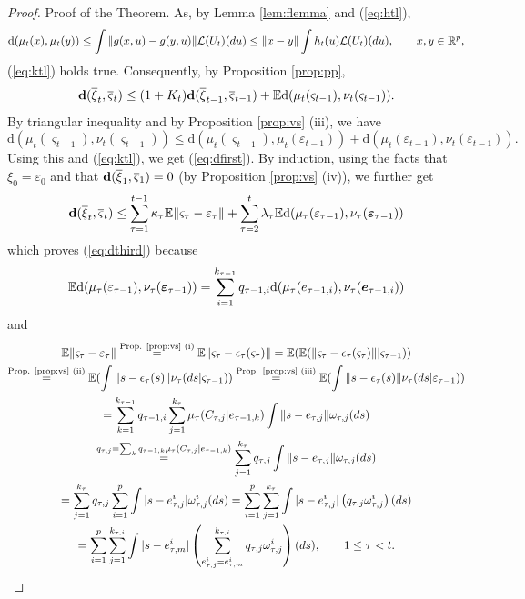 \documentclass{article}              %
\begin{document}
\begin{proof}{Proof of the Theorem.}
As, by Lemma \ref{lem:flemma} and (\ref{eq:htl}),
\[
\mathrm{d}(\mu_{t}(x),\mu_{t}(y))\leq\int\|g(x,u)-g(y,u)\|\mathcal{L}(U_{t})(du)\leq\|x-y\|\int h_{t}(u)\mathcal{L}(U_{t})(du),\qquad x,y\in\mathbb{R}^{p},
\]
(\ref{eq:ktl}) holds true. Consequently, by Proposition \ref{prop:pp},
\[
\mathbf{d}(\overline{\xi}_{t},\overline{\varsigma}_{t})\leq(1+K_{t})\mathbf{d}(\overline{\xi}_{t-1},\overline{\varsigma}_{t-1})+\mathbb{E}\mathrm{d}(\mu_{t}(\varsigma_{t-1}),\nu_{t}(\varsigma_{t-1})).
\]
By triangular inequality and by Proposition \ref{prop:vs} (iii), we have
\[
\mathrm{d}(\mu_{t}(\varsigma_{t-1}),\nu_{t}(\varsigma_{t-1}))\leq\mathrm{d}(\mu_{t}(\varsigma_{t-1}),\mu_{t}(\varepsilon_{t-1}))+\mathrm{d}(\mu_{t}(\varepsilon_{t-1}),\nu_{t}(\varepsilon{}_{t-1})).
\]
Using this and (\ref{eq:ktl}), we get (\ref{eq:dfirst}). By induction,
using the facts that $\xi_{0}=\varepsilon_{0}$ and that $\mathbf{d}(\overline{\xi}_{1},\overline{\varsigma}_{1})=0$
(by Proposition \ref{prop:vs} (iv)), we further get
\[
\mathbf{d}(\overline{\xi}_{t},\overline{\varsigma}_{t})\leq\sum_{\tau=1}^{t-1}\kappa_{\tau}\mathbb{E}\|\varsigma_{\tau}-\varepsilon_{\tau}\|+\sum_{\tau=2}^{t}\lambda_{\tau}\mathbb{E}\mathrm{d}(\mu_{\tau}(\varepsilon_{\text{\ensuremath{\tau}}-1}),\nu_{\tau}(\boldsymbol{\varepsilon}_{\tau-1}))
\]
which proves (\ref{eq:dthird}) because 
\[
\mathbb{E}\mathrm{d}(\mu_{\tau}(\varepsilon_{\text{\ensuremath{\tau}}-1}),\nu_{\tau}(\boldsymbol{\varepsilon}_{\tau-1}))=\sum_{i=1}^{k_{\tau-1}}q_{\tau-1,i}\mathrm{d}(\mu_{\tau}(e_{\text{\ensuremath{\tau}}-1,i}),\nu_{\tau}(\boldsymbol{e}_{\tau-1,i}))
\]
and  
\begin{multline*}
\mathbb{E}\|\varsigma_{\tau}-\varepsilon_{\tau}\|\stackrel{\text{Prop. \ref{prop:vs} (i)}}{=}\mathbb{E}\|\varsigma_{\tau}-\epsilon_{\tau}(\varsigma_{\tau})\|=\mathbb{E}(\mathbb{E}(\|\varsigma_{\tau}-\epsilon_{\tau}(\varsigma_{\tau})\||\varsigma_{\tau-1}))\\
\stackrel{\text{Prop. \ref{prop:vs} (ii)}}{=}\mathbb{E}(\int\|s-\epsilon_{\tau}(s)\|\nu_{\tau}(ds|\varsigma_{\tau-1}))\stackrel{\text{Prop. \ref{prop:vs} (iii)}}{=}\mathbb{E}(\int\|s-\epsilon_{\tau}(s)\|\nu_{\tau}(ds|\varepsilon_{\tau-1}))\\
=\sum_{k=1}^{k_{\tau-1}}q_{\tau-1,i}\sum_{j=1}^{k_{\tau}}\mu_{\tau}(C_{\tau,j}|e_{\tau-1,k})\int\|s-e_{\tau,j}\|\omega_{\tau,j}(ds)\\
\stackrel{q_{\tau,j}=\sum_{k}q_{\tau-1,k}\mu_{\tau}(C_{\tau,j}|e_{\tau-1,k})}{=}\sum_{j=1}^{k_{\tau}}q_{\tau,j}\int\|s-e_{\tau,j}\|\omega_{\tau,j}(ds)\\
=\sum_{j=1}^{k_{\tau}}q_{\tau,j}\sum_{i=1}^{p}\int|s-e_{\tau,j}^{i}|\omega_{\tau,j}^{i}(ds)=\sum_{i=1}^{p}\sum_{j=1}^{k_{\tau}}\int|s-e_{\tau,j}^{i}|\left(q_{\tau,j}\omega_{\tau,j}^{i}\right)(ds)\\
=\sum_{i=1}^{p}\sum_{j=1}^{k_{\tau,i}}\int|s-e_{\tau,m}^{i}|\left(\sum_{e_{\tau,j}^{i}=e_{\tau,m}^{i}}^{k_{\tau,i}}q_{\tau,j}\omega_{\tau,j}^{i}\right)(ds),\qquad1\leq\tau<t.
\end{multline*}

\end{proof}
\end{document}
